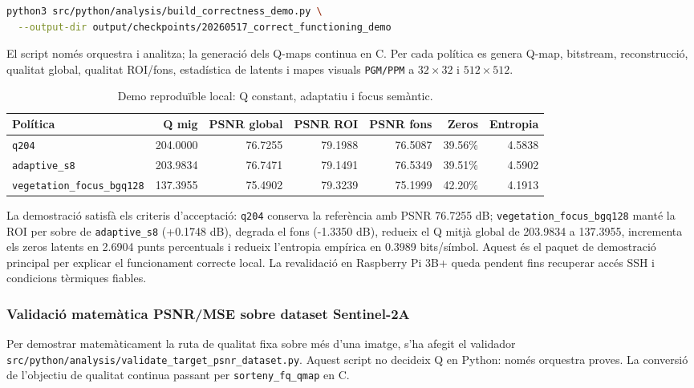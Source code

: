 \documentclass[11pt,a4paper]{article}
\begin{document}
\begin{lstlisting}[language=bash]
python3 src/python/analysis/build_correctness_demo.py \
  --output-dir output/checkpoints/20260517_correct_functioning_demo
\end{lstlisting}

El script només orquestra i analitza; la generació dels Q-maps continua en C. Per cada política es genera Q-map, bitstream, reconstrucció, qualitat global, qualitat ROI/fons, estadística de latents i mapes visuals \texttt{PGM/PPM} a $32 \times 32$ i $512 \times 512$.

\begin{table}[H]
\centering
\begin{tabular}{lrrrrrr}
\toprule
\textbf{Política} & \textbf{Q mig} & \textbf{PSNR global} & \textbf{PSNR ROI} & \textbf{PSNR fons} & \textbf{Zeros} & \textbf{Entropia} \\
\midrule
\texttt{q204} & 204.0000 & 76.7255 & 79.1988 & 76.5087 & 39.56\% & 4.5838 \\
\texttt{adaptive\_s8} & 203.9834 & 76.7471 & 79.1491 & 76.5349 & 39.51\% & 4.5902 \\
\texttt{vegetation\_focus\_bgq128} & 137.3955 & 75.4902 & 79.3239 & 75.1999 & 42.20\% & 4.1913 \\
\bottomrule
\end{tabular}
\caption{Demo reproduïble local: Q constant, adaptatiu i focus semàntic.}
\end{table}

La demostració satisfà els criteris d'acceptació: \texttt{q204} conserva la referència amb PSNR 76.7255 dB; \texttt{vegetation\_focus\_bgq128} manté la ROI per sobre de \texttt{adaptive\_s8} (+0.1748 dB), degrada el fons (-1.3350 dB), redueix el Q mitjà global de 203.9834 a 137.3955, incrementa els zeros latents en 2.6904 punts percentuals i redueix l'entropia empírica en 0.3989 bits/símbol. Aquest és el paquet de demostració principal per explicar el funcionament correcte local. La revalidació en Raspberry Pi 3B+ queda pendent fins recuperar accés SSH i condicions tèrmiques fiables.

\subsubsection{Validació matemàtica PSNR/MSE sobre dataset Sentinel-2A}

Per demostrar matemàticament la ruta de qualitat fixa sobre més d'una imatge, s'ha afegit el validador \texttt{src/python/analysis/validate\_target\_psnr\_dataset.py}. Aquest script no decideix Q en Python: només orquestra proves. La conversió de l'objectiu de qualitat continua passant per \texttt{sorteny\_fq\_qmap} en C.
\end{document}
